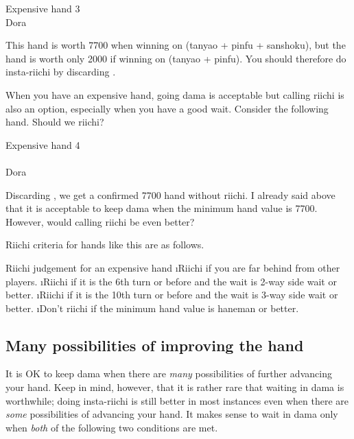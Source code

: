 \bigskip
\begin{itembox}[r]{Expensive hand 3}
\bp
{}~~\bei\\
\hfill\footnotesize{{\jap Dora}~~~~~~~}
\ep
\vspace{-15pt}
\end{itembox}

\noindent This hand is worth 7700 when winning on {\LARGE {}} ({\jap tanyao + pinfu + sanshoku}), but the hand is worth only 2000 if winning on {\LARGE {}} ({\jap tanyao + pinfu}). You should therefore do insta-riichi by discarding {\LARGE{}}.

\bigskip
When you have an expensive hand, going {\jap dama} is acceptable but calling riichi is also an option, especially when you have a good wait. Consider the following hand. Should we riichi?

\bigskip
\begin{itembox}[r]{Expensive hand 4}
\bp
{}\\ \vspace{-16pt}
\rfs{}~~\\
\hfill\footnotesize{{\jap Dora}~~~~~~~}
\ep
\vspace{-15pt}
\end{itembox}

\noindent Discarding {\LARGE{}}, we get a confirmed 7700 hand without riichi. I already said above that it is acceptable to keep {\jap dama} when the minimum hand value is 7700. However, would calling riichi be even better?

\bigskip
Riichi criteria for hands like this are as follows.

\bigskip
\begin{itembox}[c]{Riichi judgement for an expensive hand}
\bi
\i Riichi if you are far behind from other players.
\i Riichi if it is the 6th turn or before and the wait is 2-way side wait or better.
\i Riichi if it is the 10th turn or before and the wait is 3-way side wait or better.
\i Don't riichi if the minimum hand value is {\jap haneman} or better.
\ei
\vsps
\end{itembox}

\bigskip
\subsection{Many possibilities of improving the hand} \label{sec:imp}
It is OK to keep {\jap dama} when there are \emph{many} possibilities of further advancing your hand. Keep in mind, however, that it is rather rare that waiting in {\jap dama} is worthwhile; doing insta-riichi is still better in most instances even when there are \emph{some} possibilities of advancing your hand. It makes sense to wait in {\jap dama} only when \emph{both} of the following two conditions are met.

